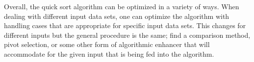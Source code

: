 \documentclass[a4paper,9pt]{article}
\begin{document}
\noindent Overall, the quick sort algorithm can be optimized in a variety of ways. When dealing with different input data sets, one can optimize the algorithm with handling cases that are appropriate for specific input data sets. This changes for different inputs but the general procedure is the same; find a comparison method, pivot selection, or some other
form of algorithmic enhancer that will accommodate for the given input that is being fed into the algorithm.
\end{document}
